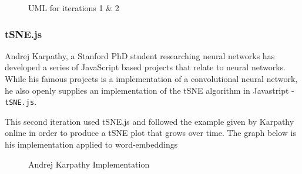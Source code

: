 \documentclass[a4paper,11pt,titlepage]{article}
\begin{document}
	\begin{figure}[H]
    			\caption{UML for iterations 1 \& 2}%
	\end{figure}


		\subsubsection{tSNE.js}
		Andrej Karpathy, a Stanford PhD student researching neural networks has developed a series of JavaScript based projects that relate to neural networks. While his famous projects is a implementation of a convolutional neural network, he also openly supplies an implementation of the tSNE algorithm in Javastript - \texttt{tSNE.js}.
		\par 
		This second iteration used tSNE.js and followed the example given by Karpathy online in order to produce a tSNE plot that grows over time. The graph below is his implementation applied to word-embeddings \cite{karpathy} 
		
	\begin{figure}[H]
    			\caption{Andrej Karpathy Implementation}%
	\end{figure}	
		
\end{document}
